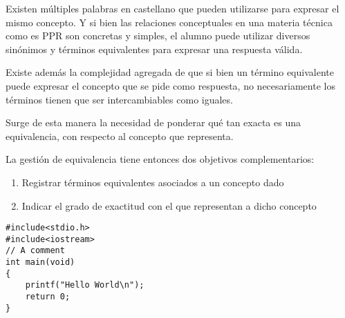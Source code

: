 \documentclass[a4paper,headsepline,footsepline,draft=false]{scrartcl}
\begin{document}
Existen múltiples palabras en castellano que pueden utilizarse para expresar el mismo concepto. Y si bien las relaciones conceptuales en una materia técnica como es PPR son concretas y simples, el alumno puede utilizar diversos sinónimos y términos equivalentes para expresar una respuesta válida.

Existe además la complejidad agregada de que si bien un término equivalente puede expresar el concepto que se pide como respuesta, no necesariamente los términos tienen que ser intercambiables como iguales.

Surge de esta manera la necesidad de ponderar qué tan exacta es una equivalencia, con respecto al concepto que representa.

La gestión de equivalencia tiene entonces dos objetivos complementarios:

\begin{enumerate}
	\item Registrar términos equivalentes asociados a un concepto dado
	\item Indicar el grado de exactitud con el que representan a dicho concepto
\end{enumerate}

\ifdefined\borrador
\begin{lstlisting}[title={Prueba de titulo},caption={Prueba de caption},captionpos=b,frame=shadowbox]
#include<stdio.h>
#include<iostream>
// A comment
int main(void)
{
	printf("Hello World\n");
	return 0;
}
\end{lstlisting}
\fi

\end{document}
